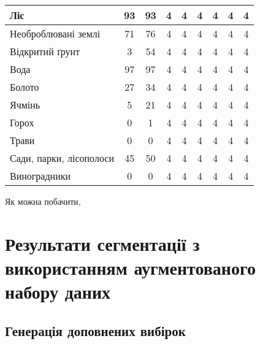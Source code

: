 \begin{table}[!ht]
\begin{tabular}{|K|C|C|C|C|C|C|C|C|}
        \hline Ліс                     & 93                              & 93                              & 4     & 4 & 4     & 4 & 4     & 4 \\
        \hline Необроблювані землі     & 71                              & 76                              & 4     & 4 & 4     & 4 & 4     & 4 \\
        \hline Відкритий ґрунт         & 3                               & 54                              & 4     & 4 & 4     & 4 & 4     & 4 \\
        \hline Вода                    & 97                              & 97                              & 4     & 4 & 4     & 4 & 4     & 4 \\
        \hline Болото                  & 27                              & 34                              & 4     & 4 & 4     & 4 & 4     & 4 \\
        \hline Ячмінь                  & 5                               & 21                              & 4     & 4 & 4     & 4 & 4     & 4 \\
        \hline Горох                   & 0                               & 1                               & 4     & 4 & 4     & 4 & 4     & 4 \\
        \hline Трави                   & 0                               & 0                               & 4     & 4 & 4     & 4 & 4     & 4 \\
        \hline Сади, парки, лісополоси & 45                              & 50                              & 4     & 4 & 4     & 4 & 4     & 4 \\
        \hline Виноградники            & 0                               & 0                               & 4     & 4 & 4     & 4 & 4     & 4 \\
        \hline
    \end{tabular}
    \label{tab:segm_result_real_per_classes}
\end{table}

Як можна побачити,

\section{Результати сегментації з використанням аугментованого набору даних}

\subsection{Генерація доповнених вибірок}

